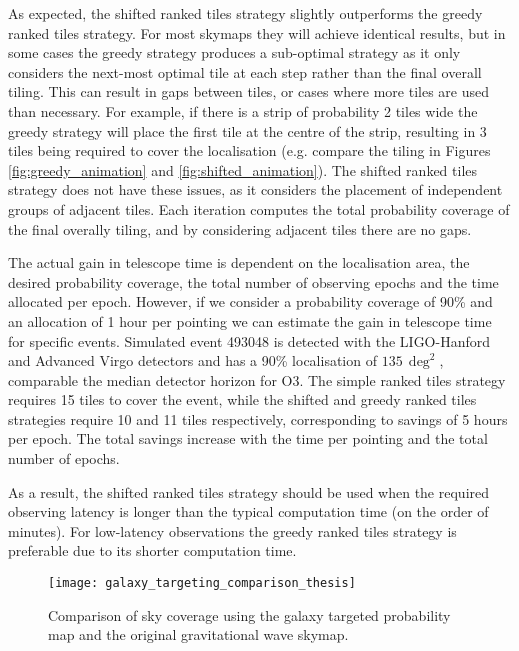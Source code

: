 As expected, the shifted ranked tiles strategy slightly outperforms the greedy ranked tiles strategy. For most skymaps they will achieve identical results, but in some cases the greedy strategy produces a sub-optimal strategy as it only considers the next-most optimal tile at each step rather than the final overall tiling. This can result in gaps between tiles, or cases where more tiles are used than necessary. For example, if there is a strip of probability 2 tiles wide the greedy strategy will place the first tile at the centre of the strip, resulting in 3 tiles being required to cover the localisation (e.g. compare the tiling in Figures \ref{fig:greedy_animation} and \ref{fig:shifted_animation}). The shifted ranked tiles strategy does not have these issues, as it considers the placement of independent groups of adjacent tiles. Each iteration computes the total probability coverage of the final overally tiling, and by considering adjacent tiles there are no gaps.

The actual gain in telescope time is dependent on the localisation area, the desired probability coverage, the total number of observing epochs and the time allocated per epoch. However, if we consider a probability coverage of 90\% and an allocation of 1 hour per pointing we can estimate the gain in telescope time for specific events. Simulated event 493048 is detected with the LIGO-Hanford and Advanced Virgo detectors and has a 90\% localisation of $135\,\deg^2$, comparable the median detector horizon for O3. The simple ranked tiles strategy requires 15 tiles to cover the event, while the shifted and greedy ranked tiles strategies require 10 and 11 tiles respectively, corresponding to savings of 5 hours per epoch. The total savings increase with the time per pointing and the total number of epochs.

As a result, the shifted ranked tiles strategy should be used when the required observing latency is longer than the typical computation time (on the order of minutes). For low-latency observations the greedy ranked tiles strategy is preferable due to its shorter computation time.


\begin{figure}
	\texttt{[image: galaxy\_targeting\_comparison\_thesis]}
	\caption[Comparison of sky coverage using the galaxy targeted probability map and the original gravitational wave skymap.]{Comparison of sky coverage using the galaxy targeted probability map and the original gravitational wave skymap.}
	\label{fig:galaxy_targeting}
\end{figure}

